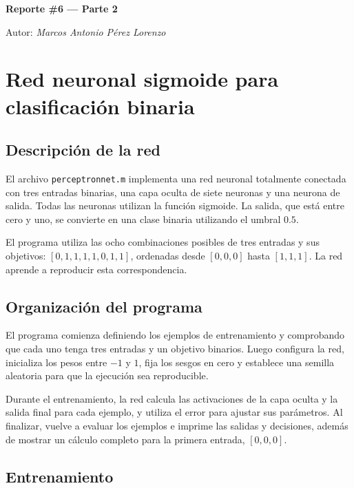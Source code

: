 \documentclass[12pt,a4paper]{article}
\begin{document}
\begin{titlepage}

  \centering
  {\huge\bfseries Reporte \#6 --- Parte 2\par}
	{\Large Autor: \itshape Marcos Antonio Pérez Lorenzo\par}
\end{titlepage}

\pagebreak

\section{Red neuronal sigmoide para clasificación binaria}

\subsection{Descripción de la red}

El archivo \texttt{perceptronnet.m} implementa una red neuronal totalmente conectada con tres entradas binarias, una capa oculta de siete neuronas y una neurona de salida. Todas las neuronas utilizan la función sigmoide. La salida, que está entre cero y uno, se convierte en una clase binaria utilizando el umbral \(0.5\).

El programa utiliza las ocho combinaciones posibles de tres entradas y sus objetivos: \([0,1,1,1,1,0,1,1]\), ordenadas desde \([0,0,0]\) hasta \([1,1,1]\). La red aprende a reproducir esta correspondencia.

\subsection{Organización del programa}

El programa comienza definiendo los ejemplos de entrenamiento y comprobando que cada uno tenga tres entradas y un objetivo binarios. Luego configura la red, inicializa los pesos entre \(-1\) y \(1\), fija los sesgos en cero y establece una semilla aleatoria para que la ejecución sea reproducible.

Durante el entrenamiento, la red calcula las activaciones de la capa oculta y la salida final para cada ejemplo, y utiliza el error para ajustar sus parámetros. Al finalizar, vuelve a evaluar los ejemplos e imprime las salidas y decisiones, además de mostrar un cálculo completo para la primera entrada, \([0,0,0]\).

\subsection{Entrenamiento}
\end{document}
